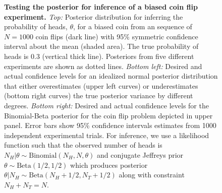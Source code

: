 \documentclass[aps,pre,twocolumn,superscriptaddress,nofootinbib]{revtex4}
\begin{document}
\begin{figure}[htb]
  \begin{center}
  \end{center}
  \caption{{\bf Testing the posterior for inference of a biased coin flip experiment.}
  \emph{Top:} Posterior distribution for inferring the probability of heads, $\theta$, for a biased coin from an sequence of $N = 1000$ coin flips (dark line) with 95\% symmetric confidence interval about the mean (shaded area).
  The true probability of heads is 0.3 (vertical thick line).
  Posteriors from five different experiments are shown as dotted lines.
  \emph{Bottom left:} Desired and actual confidence levels for an idealized normal posterior distribution that either overestimates (upper left curves) or underestimates (bottom right curves) the true posterior variance by different degrees.
  \emph{Bottom right:} Desired and actual confidence levels for the Binomial-Beta posterior for the coin flip problem depicted in upper panel.   Error bars show 95\% confidence intervals estimates from 1000 independent experimental trials.
  For inference, we use a likelihood function such that the observed number of heads is $N_H | \theta \sim \mathrm{Binomial}(N_H, N, \theta)$ and conjugate Jeffreys prior~\cite{jeffreys:proc-royal-soc-london:1946:jeffreys-prior,goyal:aip-proceedings:2005:jeffreys-prior} $\theta \sim \mathrm{Beta}(1/2, 1/2)$ which produces posterior $\theta | N_H \sim \mathrm{Beta}(N_H + 1/2, N_T + 1/2)$ along with constraint $N_H + N_T = N$.
  }
  \label{figure:biased-coin}
\end{figure}
\end{document}
